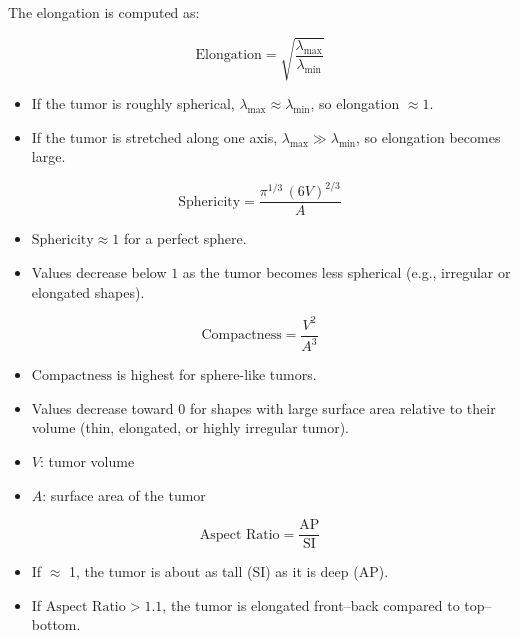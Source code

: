 \documentclass[fleqn]{article} %
\begin{document}
The elongation is computed as:

\begin{equation*}
\text{Elongation} = \sqrt{\dfrac{\lambda_{\max}}{\lambda_{\min}}}
\end{equation*}

\begin{itemize}
  \item If the tumor  is roughly spherical, $\lambda_{\max} \approx \lambda_{\min}$, so elongation $\approx 1$.
  \item If the tumor  is stretched along one axis, $\lambda_{\max} \gg \lambda_{\min}$, so elongation becomes large.
\end{itemize}

\begin{equation*}
\text{Sphericity} = \dfrac{\pi^{1/3} \, (6V)^{2/3}}{A}
\end{equation*}

\begin{itemize}
  \item $\text{Sphericity} \approx 1$ for a perfect sphere.
  \item Values decrease below $1$ as the tumor  becomes less spherical (e.g., irregular or elongated shapes).
\end{itemize}

\begin{equation*}
\text{Compactness} = \dfrac{V^2}{A^3}
\end{equation*}

\begin{itemize}
  \item $\text{Compactness}$ is highest for sphere-like tumors.
  \item Values decrease toward $0$ for shapes with large surface area relative to their volume (thin, elongated, or highly irregular tumor).
\end{itemize}

\begin{itemize}
  \item $V$: tumor volume
  \item $A$: surface area of the tumor
\end{itemize}

\begin{equation*}
\text{Aspect Ratio} = \frac{\text{AP}}{\text{SI}}
\end{equation*}

\begin{itemize}
 \item If $\approx$ 1, the tumor is about as tall (SI) as it is deep (AP).
 \item If $\text{Aspect Ratio} > 1.1$, the tumor is elongated front–back compared to top–bottom.
\end{itemize}
\end{document}
